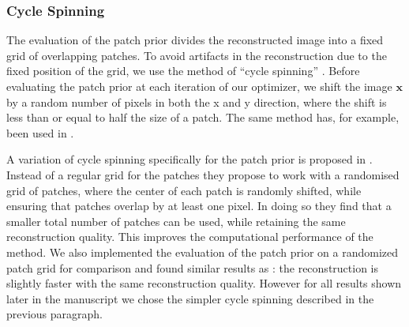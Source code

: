 \documentclass[twocolumn]{aastex631}
\DeclareMathOperator{\arcsinh}{arcsinh}
\newcommand{\todo}[1]{\textcolor{red}{TODO: #1}\PackageWarning{TODO:}{#1!}}
\begin{document}


    \subsubsection{Cycle Spinning}
    The evaluation of the patch prior divides the reconstructed image into a fixed grid of overlapping patches. To avoid artifacts in the reconstruction due to the fixed position of the grid, we use the method of \enquote{cycle spinning} \citep{Coifman1995}. Before evaluating the patch prior at each iteration of our optimizer, we shift the image $\mathbf{x}$ by a random number of pixels in both the x and y direction, where the shift is less than or equal to half the size of a patch. The same method has, for example, been used in \cite{Esch2004}.
    
    A variation of cycle spinning specifically for the patch prior is proposed in \cite{Parameswaran2018}. Instead of a regular grid for the patches they propose to work with a randomised grid of patches, where the center of each patch is randomly shifted, while ensuring that patches overlap by at least one pixel. In doing so they find that a smaller total number of patches can be used, while retaining the same reconstruction quality. This improves the computational performance of the method. We also implemented the evaluation of the patch prior on a randomized patch grid for comparison and found similar results as \cite{Parameswaran2018}: the reconstruction is slightly faster with the same reconstruction quality. However for all results shown later in the manuscript we chose the simpler cycle spinning described in the previous paragraph.


\end{document}
